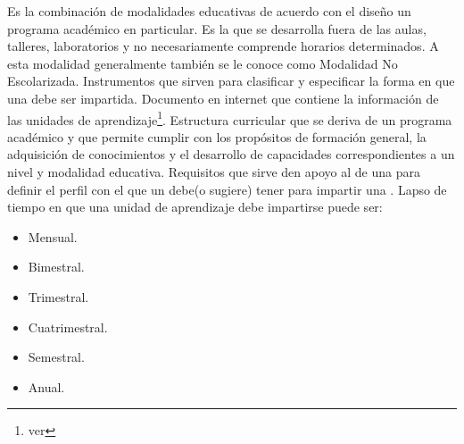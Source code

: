 \begin{bGlosario}
	 Es la combinación de modalidades educativas de acuerdo con el diseño un programa académico en particular.
		Es la que se desarrolla fuera de las aulas, talleres, laboratorios y no
	necesariamente comprende horarios determinados. A esta modalidad generalmente también se le conoce como Modalidad No Escolarizada.
	 Instrumentos que sirven para clasificar y especificar la forma en que una
	 debe ser impartida.
 	 Documento en internet que contiene la información de las unidades de
	aprendizaje\footnote{ver }.
 	 Estructura curricular que se deriva de un programa académico y que
	permite cumplir con los propósitos de formación general, la adquisición de conocimientos y el desarrollo de capacidades
	correspondientes a un nivel y modalidad educativa.%
 	 Requisitos que sirve den apoyo al  de una 
	para definir el perfil con el que un  debe(o sugiere) tener para impartir una .
 	 Lapso de tiempo en que una unidad de aprendizaje debe impartirse puede ser:
 		\begin{itemize}
 			\item Mensual.
 			\item Bimestral.
 			\item Trimestral.
 			\item Cuatrimestral.
 			\item Semestral.
 			\item Anual.
 		\end{itemize}
 	

\end{bGlosario}
